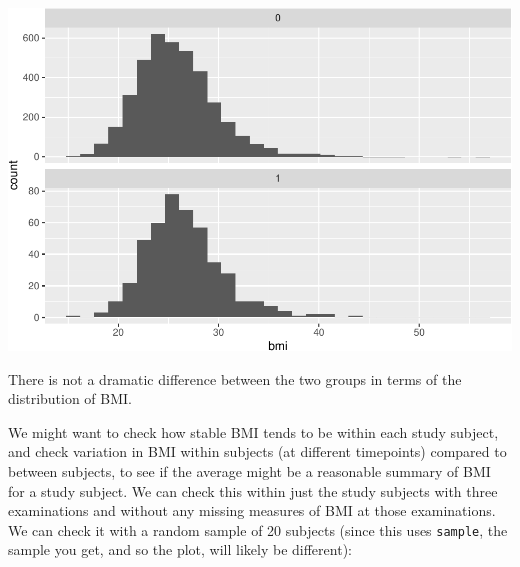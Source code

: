 \documentclass[
]{book}
\begin{document}
\includegraphics{adv_epi_analysis_files/figure-latex/unnamed-chunk-192-1.pdf}

There is not a dramatic difference between the two groups in terms of the distribution of BMI.

We might want to check how stable BMI tends to be within each study subject, and check variation in BMI within subjects (at different timepoints) compared to between subjects, to see if the average might be a reasonable summary of BMI for a study subject. We can check this within just the study subjects with three examinations and without any missing measures of BMI at those examinations. We can check it with a random sample of 20 subjects (since this uses \texttt{sample}, the sample you get, and so the plot, will likely be different):
\end{document}
